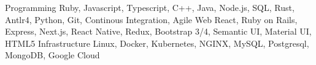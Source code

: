 \begin{cvskills}
  \cvskill
    {Programming}
    {Ruby, Javascript, Typescript, C++, Java, Node.js, SQL, Rust, Antlr4, Python, Git, Continous Integration, Agile}
  \cvskill
    {Web}
    {React, Ruby on Rails, Express, Next.js, React Native, Redux, Bootstrap 3/4, Semantic UI, Material UI, HTML5}
  \cvskill
    {Infrastructure}
    {Linux, Docker, Kubernetes, NGINX, MySQL, Postgresql, MongoDB, Google Cloud}
\end{cvskills}
